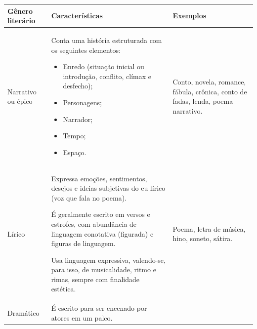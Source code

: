 \begin{longtable}[]{@{}lll@{}}
\toprule
\begin{minipage}[b]{0.29\columnwidth}\raggedright
\textbf{Gênero literário}\strut
\end{minipage} & \begin{minipage}[b]{0.29\columnwidth}\raggedright
\textbf{Características}\strut
\end{minipage} & \begin{minipage}[b]{0.29\columnwidth}\raggedright
\textbf{Exemplos}\strut
\end{minipage}\tabularnewline
\midrule
\endhead
\begin{minipage}[t]{0.29\columnwidth}\raggedright
Narrativo ou épico\strut
\end{minipage} & \begin{minipage}[t]{0.29\columnwidth}\raggedright
Conta uma história estruturada com os seguintes elementos:

\begin{itemize}
\item
  Enredo (situação inicial ou introdução,
  conflito, clímax e 
  desfecho);
\item
  Personagens;
\item
  Narrador;
\item
  Tempo;
\item
  Espaço.
\end{itemize}\strut
\end{minipage} & \begin{minipage}[t]{0.29\columnwidth}\raggedright
Conto, novela, romance, fábula, crônica, conto de fadas, lenda, poema
narrativo.\strut
\end{minipage}\tabularnewline
\begin{minipage}[t]{0.29\columnwidth}\raggedright
Lírico\strut
\end{minipage} & \begin{minipage}[t]{0.29\columnwidth}\raggedright
Expressa emoções, sentimentos, desejos e ideias subjetivas do eu lírico
(voz que fala no poema).

É geralmente escrito em versos e estrofes, com abundância de linguagem
conotativa (figurada) e figuras de linguagem.

Usa linguagem expressiva, valendo-se, para isso, de musicalidade, ritmo
e rimas, sempre com finalidade estética.\strut
\end{minipage} & \begin{minipage}[t]{0.29\columnwidth}\raggedright
Poema, letra de música, hino, soneto, sátira.\strut
\end{minipage}\tabularnewline
\begin{minipage}[t]{0.29\columnwidth}\raggedright
Dramático\strut
\end{minipage} & \begin{minipage}[t]{0.29\columnwidth}\raggedright
É escrito para ser encenado por atores em um palco.


\end{minipage}
\end{longtable}

